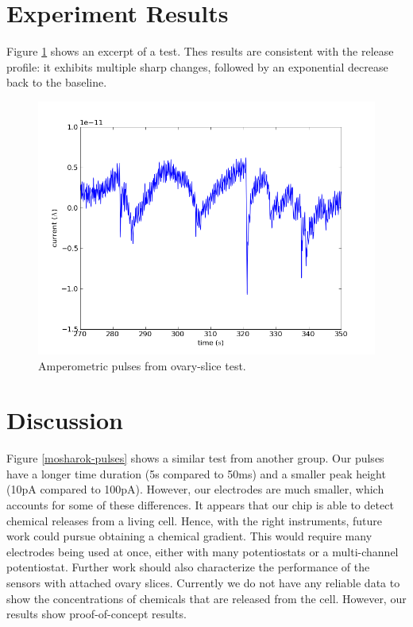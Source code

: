 \section{Experiment Results}

Figure \ref{216} shows an excerpt of a test. Thes results are consistent with the release profile: it exhibits multiple sharp changes, followed by an exponential decrease back to the baseline.

\begin{figure}
	\centering
	\includegraphics[width=0.7\linewidth]{figures/216.png}
	\caption{Amperometric pulses from ovary-slice test.}
	\label{216}
\end{figure}

\section{Discussion}

Figure \ref{mosharok-pulses} shows a similar test from another group. Our pulses have a longer time duration (5s compared to 50ms) and a smaller peak height (10pA compared to 100pA). However, our electrodes are much smaller, which accounts for some of these differences. It appears that our chip is able to detect chemical releases from a living cell. Hence, with the right instruments, future work could pursue obtaining a chemical gradient. This would require many electrodes being used at once, either with many potentiostats or a multi-channel potentiostat. Further work should also characterize the performance of the sensors with attached ovary slices. Currently we do not have any reliable data to show the concentrations of chemicals that are released from the cell. However, our results show proof-of-concept results.

